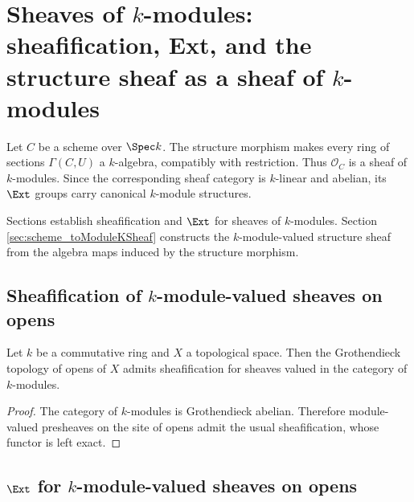 \chapter{Sheaves of \(k\)-modules: sheafification, Ext, and the structure sheaf as a sheaf of \(k\)-modules}
\label{chap:Cohomology_StructureSheafModuleK}

Let \(C\) be a scheme over \(\Spec k\). The structure morphism makes every ring of sections \(\Gamma(C,U)\) a \(k\)-algebra, compatibly with restriction. Thus \(\mathcal O_C\) is a sheaf of \(k\)-modules. Since the corresponding sheaf category is \(k\)-linear and abelian, its \(\Ext\) groups carry canonical \(k\)-module structures.

Sections  establish sheafification and \(\Ext\) for sheaves of \(k\)-modules. Section \cref{sec:scheme_toModuleKSheaf} constructs the \(k\)-module-valued structure sheaf from the algebra maps induced by the structure morphism.

\section{Sheafification of \(k\)-module-valued sheaves on opens}
\label{sec:moduleK_prereqs}

\begin{theorem}\leanok
  \label{thm:HasSheafify_Opens_ModuleCatK}
  Let \(k\) be a commutative ring and \(X\) a topological space. Then the Grothendieck topology of opens of \(X\) admits sheafification for sheaves valued in the category of \(k\)-modules.
\end{theorem}

\begin{proof}


\leanok
  The category of \(k\)-modules is Grothendieck abelian. Therefore module-valued presheaves on the site of opens admit the usual sheafification, whose functor is left exact.
\end{proof}

\section{\(\Ext\) for \(k\)-module-valued sheaves on opens}
\label{sec:moduleK_ext}

